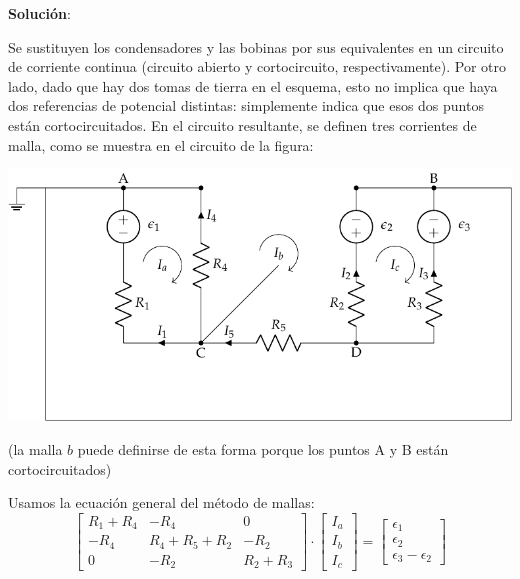 \documentclass[10pt]{article}
\begin{document}
\vspace{3mm}

\hrulefill

\vspace{5mm}
\textbf{Solución}:
\vspace{4mm}

Se sustituyen los condensadores y las bobinas por sus equivalentes en un circuito de corriente continua (circuito abierto y cortocircuito, respectivamente). Por otro lado, dado que hay dos tomas de tierra en el esquema, esto no implica que haya dos referencias de potencial distintas: simplemente indica que esos dos puntos están cortocircuitados. En el circuito resultante, se definen tres corrientes de malla, como se muestra en el circuito de la figura:

\begin{center}
  \includegraphics[scale=1.08]{figs/mallas_condensadores_sol.pdf}
\end{center}

\vspace{1mm}
(la malla $b$ puede definirse de esta forma porque los puntos A y B están cortocircuitados)

\vspace{5mm}
Usamos la ecuación general del método de mallas:    
\begin{equation*}
    \begin{bmatrix}
        R_1 + R_4 & -R_4 & 0\\
        -R_4 & R_4 + R_5 + R_2 & -R_{2}\\
        0 & -R_2 & R_2 + R_3
    \end{bmatrix} \cdot %
    \begin{bmatrix}
        I_{a}\\
        I_{b}\\
        I_{c}
    \end{bmatrix} = %
    \begin{bmatrix}
        \epsilon_1\\
        \epsilon_2\\
        \epsilon_3 - \epsilon_2
    \end{bmatrix}
\end{equation*} 
\end{document}
